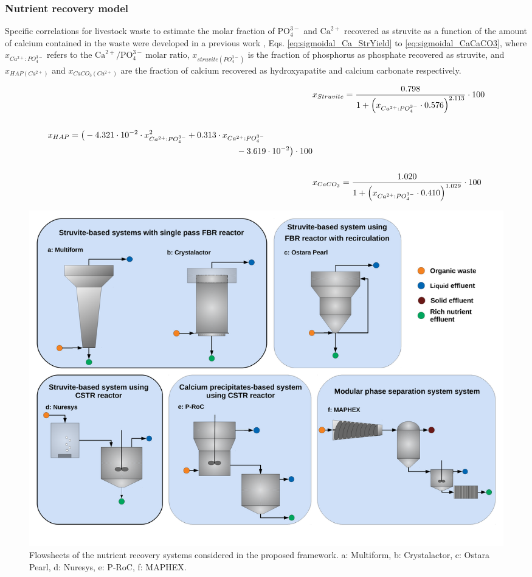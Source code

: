 \documentclass[10pt,a4paper]{article}
\begin{document}
\subsubsection{Nutrient recovery model}
Specific correlations for livestock waste to estimate the molar fraction of $\text{PO}_{4}^{3-}$ and $\text{Ca}^{2+}$ recovered as struvite as a function of the amount of calcium contained in the waste were developed in a previous work , Eqs. \ref{eq:sigmoidal_Ca_StrYield} to \ref{eq:sigmoidal_CaCaCO3}, where $x_{Ca^{2+}:PO_{4}^{3-}}$ refers to the $\text{Ca}^{2+}/\text{PO}_{4}^{3-} \ \text{molar ratio}$, $x_{struvite \left(PO_{4}^{3-}\right) }$ is the fraction of phosphorus as phosphate recovered as struvite, and $x_{HAP \left(Ca^{2+}\right)}$ and $x_{CaCO_{3} \left(Ca^{2+}\right)}$ are the fraction of calcium recovered as hydroxyapatite and calcium carbonate respectively.

\begin{align}
&x_{Struvite}= \frac{0.798}{1+\left(x_{Ca^{2+}:PO_{4}^{3-}} \cdot 0.576\right)^{2.113}} \cdot 100 \label{eq:sigmoidal_Ca_StrYield} \\
\nonumber \\
\begin{split}
& x_{HAP} =\big(-4.321 \cdot 10^{-2} \cdot x_{Ca^{2+}:PO_{4}^{3-}}^{2} + 0.313 \cdot x_{Ca^{2+}:PO_{4}^{3-}} \\& \hspace{7.8cm} - 3.619 \cdot 10^{-2} \big) \cdot 100 \label{eq:sigmoidal_Ca_HAP}
\end{split}
\\
\nonumber \\
&  x_{CaCO_{3}} = \frac{1.020}{1+\left(x_{Ca^{2+}:PO_{4}^{3-}} \cdot 0.410 \right)^{1.029}} \cdot 100 \label{eq:sigmoidal_CaCaCO3}
\end{align}

\begin{figure}[H]
	\centering
	\includegraphics[width=1\linewidth, trim={0cm 2.5cm 0cm 0cm},clip]{diagrams} 
	\caption{Flowsheets of the nutrient recovery systems considered in the proposed framework. a: Multiform, b: Crystalactor, c: Ostara Pearl, d: Nuresys, e: P-RoC, f: MAPHEX.}
	\label{fig:techs_diagrams}
\end{figure}
\end{document}
